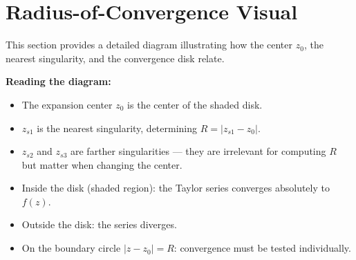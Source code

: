 \documentclass[12pt,a4paper]{article}
\begin{document}
\section{Radius-of-Convergence Visual}

This section provides a detailed diagram illustrating how the center $z_0$, the nearest singularity, and the convergence disk relate.

\begin{center}
\end{center}

\noindent
\textbf{Reading the diagram:}
\begin{itemize}[noitemsep]
  \item The expansion center $z_0$ is the center of the shaded disk.
  \item $z_{s1}$ is the nearest singularity, determining $R = |z_{s1} - z_0|$.
  \item $z_{s2}$ and $z_{s3}$ are farther singularities --- they are irrelevant for computing $R$ but matter when changing the center.
  \item Inside the disk (shaded region): the Taylor series converges absolutely to $f(z)$.
  \item Outside the disk: the series diverges.
  \item On the boundary circle $|z-z_0|=R$: convergence must be tested individually.
\end{itemize}
\end{document}
